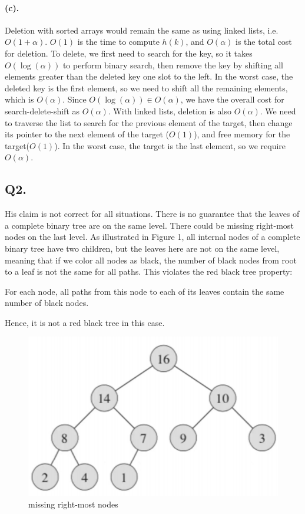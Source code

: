 \documentclass[12pt]{article}
\begin{document}
\paragraph{(c).} Deletion with sorted arrays would remain the same as using linked lists, i.e. \(O(1 +\alpha)\). \(O(1)\) is the time to compute \(h(k)\), and \(O(\alpha)\) is the total cost for deletion. To delete, we first need to search for the key, so it takes \(O(\log(\alpha))\) to perform binary search, then remove the key by shifting all elements greater than the deleted key one slot to the left. In the worst case, the deleted key is the first element, so we need to shift all the remaining elements, which is \(O(\alpha)\). Since \(O(\log(\alpha)) \in O(\alpha)\), we have the overall cost for search-delete-shift as \(O(\alpha)\). With linked lists, deletion is also \(O(\alpha)\). We need to traverse the list to search for the previous element of the target, then change its pointer to the next element of the target (\(O(1)\)), and free memory for the target(\(O(1)\)). In the worst case, the target is the last element, so we require \(O(\alpha)\).

\subsection*{Q2.}
His claim is not correct for all situations. There is no guarantee that the leaves of a complete binary tree are on the same level. There could be missing right-most nodes on the last level. As illustrated in Figure 1, all internal nodes of a complete binary tree have two children, but the leaves here are not on the same level, meaning that if we color all nodes as black, the number of black nodes from root to a leaf is not the same for all paths. This violates the red black tree property:
\begin{displayquote}[][]
     For each node, all paths from this node to each of its leaves contain the same number of black nodes.
\end{displayquote}
Hence, it is not a red black tree in this case.
\begin{figure}[H]
     \centering
     \includegraphics[scale =0.8]{q2a.png} 
     \caption{missing right-most nodes}
\end{figure}
\end{document}
